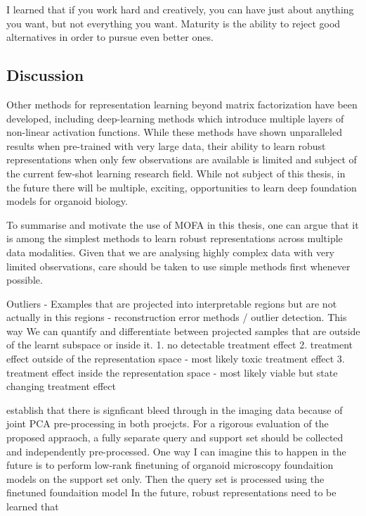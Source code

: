 \begin{savequote}[75mm]
I learned that if you work hard and creatively, you can have just about anything you want, but not everything you want. Maturity is the ability to reject good alternatives in order to pursue even better ones.

\end{savequote}

\begin{flushleft}

\chapter{Discussion}


Other methods for representation learning beyond matrix factorization have been developed, including deep-learning methods which introduce multiple layers of non-linear activation functions. While these methods have shown unparalleled results when pre-trained with very large data, their ability to learn robust representations when only few observations are available is limited and subject of the current few-shot learning research field. While not subject of this thesis, in the future there will be multiple, exciting, opportunities to learn deep foundation models for organoid biology. 

To summarise and motivate the use of MOFA in this thesis, one can argue that it is among the simplest methods to learn robust representations across multiple data modalities. Given that we are analysing highly complex data with very limited observations, care should be taken to use simple methods first whenever possible. 

Outliers - Examples that are projected into interpretable regions but are not actually in this regions - reconstruction error methods / outlier detection. This way We can quantify and differentiate between projected samples that are outside of the learnt subspace or inside it.  
1. no detectable treatment effect
2. treatment effect outside of the representation space - most likely toxic treatment effect
3. treatment effect inside the representation space - most likely viable but state changing treatment effect

establish that there is signficant bleed through in the imaging data because of joint PCA pre-processing in both proejcts. 
For a rigorous evaluation of the proposed appraoch, a fully separate query and support set should be collected and independently pre-processed. 
One way I can imagine this to happen in the future is to perform low-rank finetuning of organoid microscopy foundaition models on the support set only. Then the query set is processed using the finetuned foundaition model
In the future, robust representations need to be learned that 


\end{flushleft}
